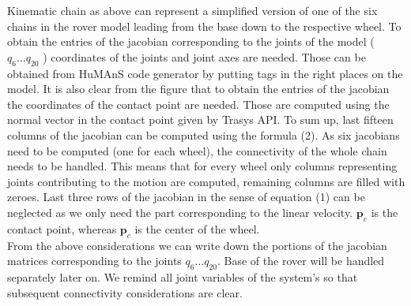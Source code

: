 \documentclass[a4paper]{article}
\begin{document}
\noindent Kinematic chain as above can represent a simplified version of one of the six chains in the rover model leading from the base down to the respective wheel. To obtain the entries of the jacobian corresponding to the joints of the model ( $q_{6} \ldots q_{20}$ ) coordinates of the joints and joint axes are needed. Those can be obtained from HuMAnS code generator by putting tags in the right places on the model. 
It is also clear from the figure that to obtain the entries of the jacobian the coordinates of the contact point are needed. Those are computed using the normal vector in the contact point given by Trasys API. 
To sum up, last fifteen columns of the jacobian can be computed using the formula (2). As six jacobians need to be computed (one for each wheel), the connectivity of the whole chain needs to be handled. This means that
for every wheel only columns representing joints contributing to the motion are computed, remaining columns are filled with zeroes. Last three rows of the jacobian in the sense of equation (1) can be neglected as we only need 
the part corresponding to the linear velocity. $\boldsymbol{p}_{e}$ is the contact point, whereas $\boldsymbol{p}_{c}$ is the center of the wheel. \\

\noindent From the above considerations we can write down the portions of the jacobian matrices corresponding to the joints $q_{6} \ldots q_{20}$. Base of the rover will be handled separately later on. We remind all joint 
variables of the system's so that subsequent connectivity considerations are clear. 
\end{document}
